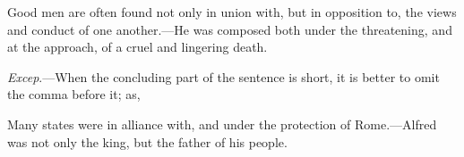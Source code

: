 \begin{example}
    Good men are often found not only in union with, but in opposition to, the
    views and conduct of one another.---He was composed both under the
    threatening, and at the approach, of a cruel and lingering death.
\end{example}

\emph{Excep}.---When the concluding part of the sentence is short, it is better
to omit the comma before it; as,

\begin{example}
    Many states were in alliance with, and under the protection of
    Rome.---Alfred was not only the king, but the father of his people.
\end{example}

